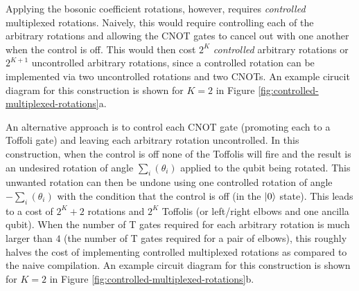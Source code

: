 Applying the bosonic coefficient rotations, however, requires \textit{controlled} multiplexed rotations.
Naively, this would require controlling each of the arbitrary rotations and allowing the CNOT gates to cancel out with one another when the control is off.
This would then cost $2^K$ \textit{controlled} arbitrary rotations or $2^{K+1}$ uncontrolled arbitrary rotations, since a controlled rotation can be implemented via two uncontrolled rotations and two CNOTs.
An example cirucit diagram for this construction is shown for $K = 2$ in Figure \ref{fig:controlled-multiplexed-rotations}a.

An alternative approach is to control each CNOT gate (promoting each to a Toffoli gate) and leaving each arbitrary rotation uncontrolled.
In this construction, when the control is off none of the Toffolis will fire and the result is an undesired rotation of angle $\sum_{i} (\theta_i)$ applied to the qubit being rotated.
This unwanted rotation can then be undone using one controlled rotation of angle $- \sum_{i} (\theta_i)$ with the condition that the control is off (in the $\ket{0}$ state).
This leads to a cost of $2^K + 2$ rotations and $2^K$ Toffolis (or left/right elbows and one ancilla qubit).
When the number of T gates required for each arbitrary rotation is much larger than $4$ (the number of T gates required for a pair of elbows), this roughly halves the cost of implementing controlled multiplexed rotations as compared to the naive compilation.
An example circuit diagram for this construction is shown for $K = 2$ in Figure \ref{fig:controlled-multiplexed-rotations}b.